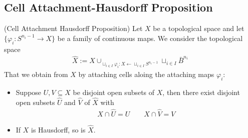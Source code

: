 \documentclass[Total.tex]{subfiles}
\begin{document}
	\subsection{Cell Attachment-Hausdorff Proposition}
	\begin{proposition}
		(Cell Attachment Hausdorff Proposition) Let $X$ be a topological space and let $\{\varphi_i:S^{n_i-1}\rightarrow X\}$ be a family of continuous maps. We consider the topological space
		\begin{gather*}
			\hat{X}:=X\cup_{\sqcup_{i\in I} \varphi_i:X\leftarrow \sqcup_{i\in I} S^{n_i-1}}  \sqcup_{i\in I} \bar{B}^{n_i}
		\end{gather*}
		That we obtain from $X$ by attaching cells aloing the attaching maps $\varphi_i$:
		\begin{itemize}
			\item Suppose $U,V\subseteq X$ be disjoint open subsets of $X$, then there exist disjoint open subsets $\hat{U}$ and $\hat{V}$ of $\hat{X}$ with
			\begin{gather*}
				X\cap \hat{U}=U\qquad X\cap \hat{V}=V
			\end{gather*}
			\item If $X$ is Hausdorff, so is $\hat{X}$.
		\end{itemize}
	\end{proposition}
\end{document}
